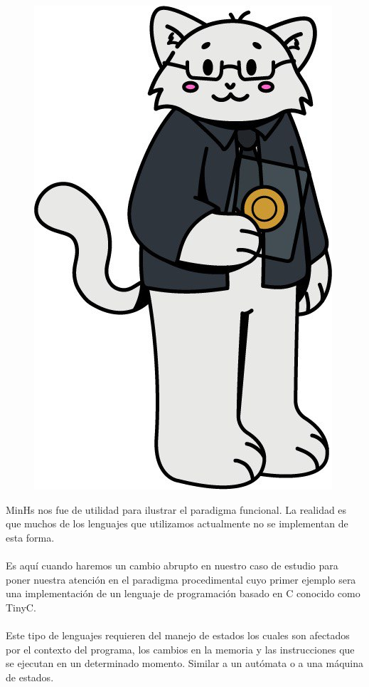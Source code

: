 
\begin{figure}[htbp]
    \centerline{\includegraphics[scale=.35]{assets/09_Dennis_Ritchie_gato.jpg}}
\end{figure}

\textsf{MinHs} nos fue de utilidad para ilustrar el paradigma funcional. La realidad es que muchos de los lenguajes que utilizamos actualmente no se implementan de esta forma.\\\\
Es aquí cuando haremos un cambio abrupto en nuestro caso de estudio para poner nuestra atención en el paradigma procedimental cuyo primer ejemplo sera una implementación de un lenguaje de programación basado en \textsf{C} conocido como \textsf{TinyC}.\\\\
Este tipo de lenguajes requieren del manejo de estados los cuales son afectados por el contexto del programa, los cambios en la memoria y las instrucciones que se ejecutan en un determinado momento. Similar a un autómata o a una máquina de estados.


